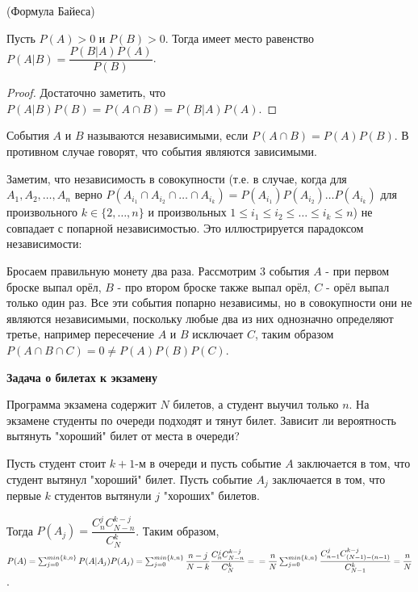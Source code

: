 \documentclass[a4paper]{article}
\begin{document}
\begin{colloq}
	\begin{theorem*} (Формула Байеса)
		
		Пусть $P(A) > 0$ и $P(B) > 0$. Тогда имеет место равенство $P(A|B) = \dfrac{P(B|A)P(A)}{P(B)}$.
	\end{theorem*}

	\begin{proof}
		Достаточно заметить, что $P(A|B)P(B) = P(A \cap B) = P(B|A)P(A)$.
	\end{proof}

	\begin{definition*}
		События $A$ и $B$ называются независимыми, если $P(A \cap B) = P(A)P(B)$. В противном случае говорят, что события являются зависимыми.
	\end{definition*}

	Заметим, что независимость в совокупности (т.е. в случае, когда для $A_1, A_2, \dots, A_n$ верно $P(A_{i_1} \cap A_{i_2} \cap \dots \cap A_{i_k}) = P(A_{i_1})P(A_{i_2}) \dots P(A_{i_k})$ для произвольного $k \in \{2, \dots, n\}$ и произвольных $1 \leqslant i_1 \leqslant i_2 \leqslant \dots \leqslant i_k \leqslant n$) не совпадает с попарной независимостью. Это иллюстрируется парадоксом независимости:
	
	Бросаем правильную монету два раза. Рассмотрим 3 события $A$ - при первом броске выпал орёл, $B$ - про втором броске также выпал орёл, $C$ - орёл выпал только один раз. Все эти события попарно независимы, но в совокупности они не являются независимыми, поскольку любые два из них однозначно определяют третье, например пересечение $A$ и $B$ исключает $C$, таким образом $P(A \cap B \cap C) = 0 \neq P(A)P(B)P(C)$.
	
	\textbf{Задача о билетах к экзамену}
	
	Программа экзамена содержит $N$ билетов, а студент выучил только $n$. На экзамене
	студенты по очереди подходят и тянут билет. Зависит ли вероятность вытянуть "хороший"
	билет от места в очереди?
	
	Пусть студент стоит $k+1$-м в очереди и пусть событие $A$ заключается в том, что студент
	вытянул "хороший" билет. Пусть событие $A_j$ заключается в том, что первые $k$ студентов
	вытянули $j$ "хороших" билетов. 
	
	Тогда $P(A_j) = \dfrac{C_n^j C^{k-j}_{N-n}}{C_N^k}$. Таким образом,	$P(A) = \sum_{j=0}^{min\{k, n\}} P(A|A_j)P(A_j) = \sum_{j=0}^{min\{k, n\}} \dfrac{n-j}{N-k} \dfrac{C_n^j C^{k-j}_{N-n}}{C_N^k} = \\ = \dfrac{n}{N} \sum_{j=0}^{min\{k, n\}} \dfrac{C_{n-1}^j C^{k-j}_{(N - 1) - (n - 1)}}{C_{N - 1}^k} = \dfrac{n}{N}$.
   	

\end{colloq}
\end{document}
